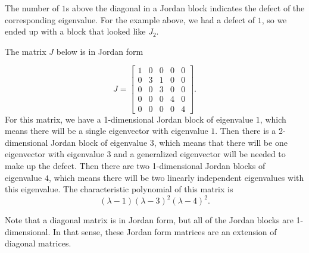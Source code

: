 \begin{remark}
The number of $1$s above the diagonal in a Jordan block indicates the defect of the corresponding eigenvalue. For the example above, we had a defect of $1$, so we ended up with a block that looked like $J_2$. 
\end{remark} 

\begin{example}
The matrix $J$ below is in Jordan form
\begin{center}
\end{center}

\[ J = \begin{bmatrix} 1 & 0 & 0 & 0 & 0 \\ 0 & 3 & 1 & 0 & 0 \\ 0 &0 & 3 &0 &0 \\ 0 & 0 & 0 &4& 0 \\ 0 & 0 & 0 & 0 & 4 \end{bmatrix}.\] 
For this matrix, we have a 1-dimensional Jordan block of eigenvalue $1$, which means there will be a single eigenvector with eigenvalue $1$. Then there is a 2-dimensional Jordan block of eigenvalue $3$, which means that there will be one eigenvector with eigenvalue $3$ and a generalized eigenvector will be needed to make up the defect. Then there are two 1-dimensional Jordan blocks of eigenvalue $4$, which means there will be two linearly independent eigenvalues with this eigenvalue. The characteristic polynomial of this matrix is
\[ (\lambda - 1)(\lambda-3)^2(\lambda-4)^2. \]
\end{example}

\begin{remark}
Note that a diagonal matrix is in Jordan form, but all of the Jordan blocks are 1-dimensional. In that sense, these Jordan form matrices are an extension of diagonal matrices. 
\end{remark}

